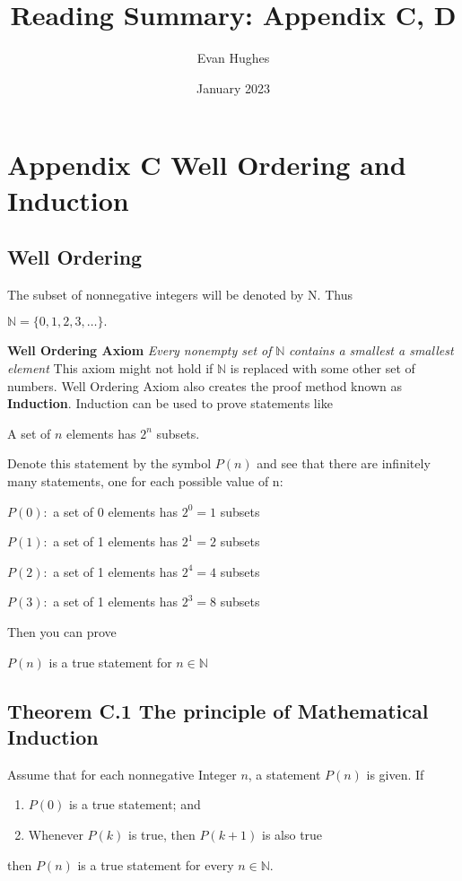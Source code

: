 \documentclass{article}
\title{Reading Summary: Appendix C, D}
\author{Evan Hughes}
\date{January 2023}
\begin{document}
\maketitle

\section*{Appendix C Well Ordering and Induction}
\subsection*{Well Ordering}
The subset of nonnegative integers will be
denoted by N. Thus 
\begin{center}
    $\mathbb{N}  = \{ 0,1,2,3,\ldots \}. $
\end{center}

\textbf{Well Ordering Axiom} \emph{Every nonempty set of } $\mathbb{N}$ \emph{contains a smallest a smallest element}
This axiom might not hold if $\mathbb{N}$ is replaced with some other set of numbers.
Well Ordering Axiom also creates the proof method known as \textbf{Induction}.
Induction can be used to prove statements like 
\begin{center}
    A set of $n$ elements has $2^n$ subsets.
\end{center}
    
Denote this statement by the symbol $P(n)$ and see that there are infinitely
many statements, one for each possible value of n: 


$P(0)\colon$ a set of 0 elements has $2^0 = 1$ subsets

$P(1)\colon$ a set of 1 elements has $2^1 = 2$ subsets

$P(2)\colon$ a set of 1 elements has $2^4 = 4$ subsets

$P(3)\colon$ a set of 1 elements has $2^3 = 8$ subsets


Then you can prove 
\begin{center}
    $P(n)$ is a true statement for $n \in \mathbb{N}$
\end{center}

\subsection*{Theorem C.1 The principle of Mathematical Induction}

Assume that for each nonnegative Integer $n$, a statement $P(n)$ is given. If
\begin{enumerate}
    \item $P(0)$ is a true statement; and
    \item Whenever $P(k)$ is true, then $P(k+1)$ is also true
\end{enumerate}
then $P(n)$ is a true statement for every $n \in \mathbb{N}$. 
\end{document}

